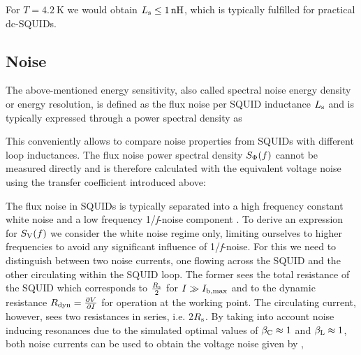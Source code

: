
For $T=\qty{4.2}{\kelvin}$ we would obtain $L_{\rm s}\leq\qty{1}{n\henry}$, which is typically fulfilled for practical dc-SQUIDs.

\subsection{Noise}
\label{subsec_noise_theo}

The above-mentioned energy sensitivity, also called spectral noise energy density or energy resolution, is defined as the flux noise per SQUID inductance $L_{\rm s}$ and is typically expressed through a power spectral density as 


This conveniently allows to compare noise properties from SQUIDs with different loop inductances. The flux noise power spectral density $S_{\rm \Phi}(f)$ cannot be measured directly and is therefore calculated with the equivalent voltage noise using the transfer coefficient introduced above: 


The flux noise in SQUIDs is typically separated into a high frequency constant white noise and a low frequency 1/\textit{f}-noise component \cite{Koch2007}. To derive an expression for $S_{\rm V}(f)$ we consider the white noise regime only, limiting ourselves to higher frequencies to avoid any significant influence of 1/\textit{f}-noise. For this we need to distinguish between two noise currents, one flowing across the SQUID and the other circulating within the SQUID loop. The former sees the total resistance of the SQUID which corresponds to $\frac{R_{\rm s}}{2}$ for $I\gg I_{\rm b,max}$ and to the dynamic resistance $R_{\rm dyn}=\frac{\partial V}{\partial I}$ for operation at the working point. The circulating current, however, sees two resistances in series, i.e. 2$R_{\rm s}$. By taking into account noise inducing resonances due to the simulated optimal values of $\beta_{\rm C}\approx 1$ and $\beta_{\rm L}\approx 1$, both noise currents can be used to obtain the voltage noise given by \cite{Tesche1977}, \cite{Bruines1982}
 
